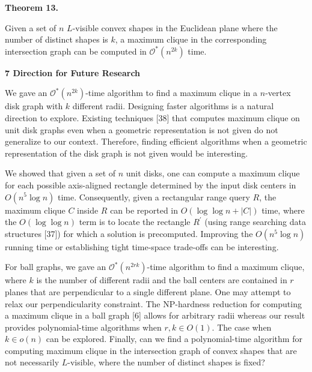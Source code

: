 \documentclass[10pt,a4paper]{amsart}
\begin{document}
\par\medskip\noindent\textbf{Theorem 13.}\par
Given a set of $n$ $L$-visible convex shapes in the Euclidean plane where the number of distinct shapes is $k$, a maximum clique in the corresponding intersection graph can be computed in $\mathcal{O}^{*}(n^{2k})$ time.
\par
\par
\par

\par
\par
\par\medskip\noindent\textbf{7 Direction for Future Research}\par
We gave an $\mathcal{O}^{*}(n^{2k})$-time algorithm to find a maximum clique in a $n$-vertex disk graph with $k$ different radii. Designing faster algorithms is a natural direction to explore. Existing techniques [38] that computes maximum clique on unit disk graphs even when a geometric representation is not given do not generalize to our context. Therefore, finding efficient algorithms when a geometric representation of the disk graph is not given would be interesting.
\par
\par
We showed that given a set of $n$ unit disks, one can compute a maximum clique for each possible axis-aligned rectangle determined by the input disk centers in $O(n^{5}\log n)$ time. Consequently, given a rectangular range query $R$, the maximum clique $C$ inside $R$ can be reported in $O(\log\log n+|C|)$ time, where the $O(\log\log n)$ term is to locate the rectangle $R^{\prime}$ (using range searching data structures [37]) for which a solution is precomputed. Improving the $O(n^{5}\log n)$ running time or establishing tight time-space trade-offs can be interesting.
\par
\par
For ball graphs, we gave an $\mathcal{O}^{*}(n^{2rk})$-time algorithm to find a maximum clique, where $k$ is the number of different radii and the ball centers are contained in $r$ planes that are perpendicular to a single different plane. One may attempt to relax our perpendicularity constraint. The NP-hardness reduction for computing a maximum clique in a ball graph [6] allows for arbitrary radii whereas our result provides polynomial-time algorithms when $r,k\in O(1)$. The case when $k\in o(n)$ can be explored. Finally, can we find a polynomial-time algorithm for computing maximum clique in the intersection graph of convex shapes that are not necessarily $L$-visible, where the number of distinct shapes is fixed?
\end{document}
